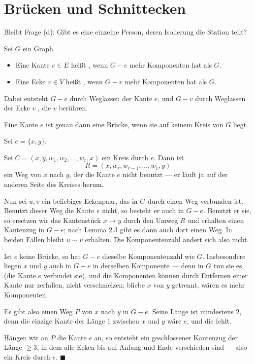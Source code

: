 \section{Brücken und Schnittecken}

Bleibt Frage (d): Gibt es eine einzelne Person, deren Isolierung die Station teilt?

\begin{definition}
Sei $G$ ein Graph.
\begin{itemize}[leftmargin=1.4em, itemsep=4pt]
\item Eine Kante $e \in E$ heißt , wenn $G - e$ mehr Komponenten hat als $G$.
\item Eine Ecke $v \in V$ heißt , wenn $G - v$ mehr Komponenten hat als $G$.
\end{itemize}
Dabei entsteht $G-e$ durch Weglassen der Kante $e$, und $G-v$ durch Weglassen der Ecke $v$ , die $v$ berühren.
\end{definition}

\begin{merksatz}
Eine Kante $e$ ist genau dann eine Brücke, wenn sie auf keinem Kreis von $G$ liegt.
\end{merksatz}

\begin{merksatz}
Sei $e = \{x,y\}$.

Sei $C = (x, y, w_1, w_2, \ldots, w_r, x)$ ein Kreis durch $e$. Dann ist
\[ R = (x, w_r, w_{r-1}, \ldots, w_1, y) \]
ein Weg von $x$ nach $y$, der die Kante $e$ nicht benutzt --- er läuft ja auf der anderen Seite des Kreises herum.

Nun sei $u,v$ ein beliebiges Eckenpaar, das in $G$ durch einen Weg verbunden ist. Benutzt dieser Weg die Kante $e$ nicht, so besteht er auch in $G - e$. Benutzt er sie, so ersetzen wir das Kantenstück $x \to y$ durch den Umweg $R$ und erhalten einen Kantenzug in $G-e$; nach Lemma 2.3 gibt es dann auch dort einen Weg. In beiden Fällen bleibt $u \sim v$ erhalten. Die Komponentenzahl ändert sich also nicht.

Ist $e$ keine Brücke, so hat $G-e$ dieselbe Komponentenzahl wie $G$. Insbesondere liegen $x$ und $y$ auch in $G-e$ in derselben Komponente --- denn in $G$ tun sie es (die Kante $e$ verbindet sie), und die Komponenten können durch Entfernen einer Kante nur zerfallen, nicht verschmelzen; bliebe $x$ von $y$ getrennt, wären es mehr Komponenten.

Es gibt also einen Weg $P$ von $x$ nach $y$ in $G - e$. Seine Länge ist mindestens $2$, denn die einzige Kante der Länge $1$ zwischen $x$ und $y$ wäre $e$, und die fehlt.

Hängen wir an $P$ die Kante $e$ an, so entsteht ein geschlossener Kantenzug der Länge $\ge 3$, in dem alle Ecken bis auf Anfang und Ende verschieden sind --- also ein Kreis durch $e$. $\blacksquare$
\end{merksatz}

